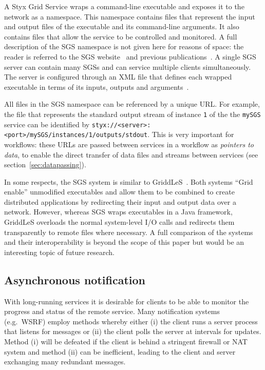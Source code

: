 \documentclass[a4paper]{article}
\begin{document}
A Styx Grid Service wraps a command-line executable and exposes it to the network as a namespace.  This namespace contains files that represent the input and output files of the executable and its command-line arguments.  It also contains files that allow the service to be controlled and monitored.  A full description of the SGS namespace is not given here for reasons of space: the reader is referred to the SGS website~\cite{sgswebsite} and previous publications~\cite{blower:2005, blower_escience:2006, blower_lncs:2006}.  A single SGS server can contain many SGSs and can service multiple clients simultaneously.  The server is configured through an XML file that defines each wrapped executable in terms of its inputs, outputs and arguments~\cite{blower_escience:2006}.

All files in the SGS namespace can be referenced by a unique URL.  For example, the file that represents the standard output stream of instance \texttt{1} of the the \texttt{mySGS} service can be identified by \texttt{styx://<server>:<port>/mySGS/instances/1/outputs/stdout}.  This is very important for workflows: these URLs are passed between services in a workflow as \textit{pointers to data}, to enable the direct transfer of data files and streams between services (see section~\ref{sec:datapassing}).

In some respects, the SGS system is similar to GriddLeS~\cite{abramson:2004}.  Both systems ``Grid enable'' unmodified executables and allow them to be combined to create distributed applications by redirecting their input and output data over a network.  However, whereas SGS wraps executables in a Java framework, GriddLeS overloads the normal system-level I/O calls and redirects them transparently to remote files where necessary.  A full comparison of the systems and their interoperability is beyond the scope of this paper but would be an interesting topic of future research.


\subsection{Asynchronous notification}\label{sec:notification}
With long-running services it is desirable for clients to be able to monitor the progress and status of the remote service.  Many notification systems (e.g.\ WSRF) employ methods whereby either (i) the client runs a server process that listens for messages or (ii) the client polls the server at intervals for updates.  Method (i) will be defeated if the client is behind a stringent firewall or NAT system and method (ii) can be inefficient, leading to the client and server exchanging many redundant messages.
\end{document}
